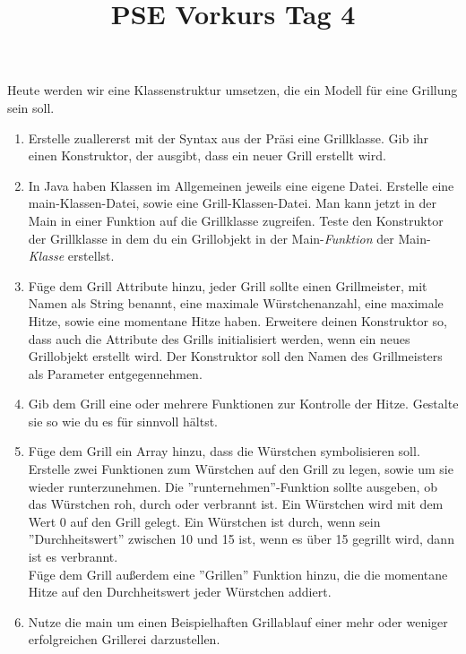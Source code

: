\documentclass{../../sheet}
\title{PSE Vorkurs Tag 4}
\begin{document}
\maketitle

\newpage

Heute werden wir eine Klassenstruktur umsetzen, die ein Modell für eine Grillung sein soll.

\begin{enumerate}
    \item Erstelle zuallererst mit der Syntax aus der Präsi eine Grillklasse. Gib ihr einen Konstruktor, der ausgibt, dass ein neuer Grill erstellt wird. 
    \item In Java haben Klassen im Allgemeinen jeweils eine eigene Datei. Erstelle eine main-Klassen-Datei, sowie eine Grill-Klassen-Datei. Man kann jetzt in der Main in einer Funktion auf die Grillklasse zugreifen. Teste den Konstruktor der Grillklasse in dem du ein Grillobjekt in der Main-\textit{Funktion} der Main-\textit{Klasse} erstellst.
    \item Füge dem Grill Attribute hinzu, jeder Grill sollte einen Grillmeister, mit Namen als String benannt, eine maximale Würstchenanzahl, eine maximale Hitze, sowie eine momentane Hitze haben. Erweitere deinen Konstruktor so, dass auch die Attribute des Grills initialisiert werden, wenn ein neues Grillobjekt erstellt wird. Der Konstruktor soll den Namen des Grillmeisters als Parameter entgegennehmen.
    \item Gib dem Grill eine oder mehrere Funktionen zur Kontrolle der Hitze. Gestalte sie so wie du es für sinnvoll hältst.
    \item Füge dem Grill ein Array hinzu, dass die Würstchen symbolisieren soll. Erstelle zwei Funktionen zum Würstchen auf den Grill zu legen, sowie um sie wieder runterzunehmen. Die ''runternehmen''-Funktion sollte ausgeben, ob das Würstchen roh, durch oder verbrannt ist. Ein Würstchen wird mit dem Wert 0 auf den Grill gelegt. Ein Würstchen ist durch, wenn sein ''Durchheitswert'' zwischen 10 und 15 ist, wenn es über 15 gegrillt wird, dann ist es verbrannt. \\
    Füge dem Grill außerdem eine ''Grillen'' Funktion hinzu, die die momentane Hitze auf den Durchheitswert jeder Würstchen addiert.
    \item Nutze die main um einen Beispielhaften Grillablauf einer mehr oder weniger erfolgreichen Grillerei darzustellen. 
\end{enumerate}
\end{document}
